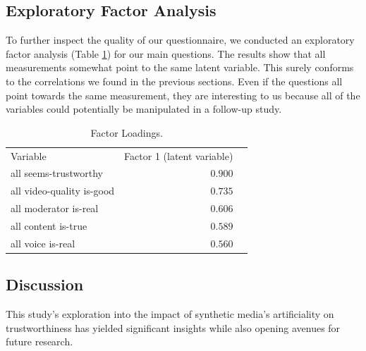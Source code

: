 \documentclass[
  a4paper,  %
  twoside,  %
  bibliography=totoc,
  headsepline,
  cleardoublepage=empty,
  parskip=half,
  draft=false
]{scrbook}
\begin{document}
 \subsection{Exploratory Factor Analysis}
\label{subsec:factor-analysis}

To further inspect the quality of our questionnaire, we conducted an exploratory factor analysis (Table \ref{tab:factorLoadings}) for our main questions. The results show that all measurements somewhat point to the same latent variable. This surely conforms to the correlations we found in the previous sections. Even if the questions all point towards the same measurement, they are interesting to us because all of the variables could potentially be manipulated in a follow-up study.

\begin{table}[h]
	\centering
	\caption{Factor Loadings.}
	\label{tab:factorLoadings}
	{
		\begin{tabular}{lrr}
			\toprule
			Variable & Factor 1 (latent variable)  \\
			\cmidrule[0.4pt]{1-2}
			all seems-trustworthy & $0.900$  \\
			all video-quality is-good & $0.735$  \\
			all moderator is-real & $0.606$  \\
			all content is-true & $0.589$  \\
			all voice is-real & $0.560$  \\
			\bottomrule
		\end{tabular}
	}
\end{table}

\subsection{Discussion}

This study's exploration into the impact of synthetic media's artificiality on trustworthiness has yielded significant insights while also opening avenues for future research.
\end{document}
